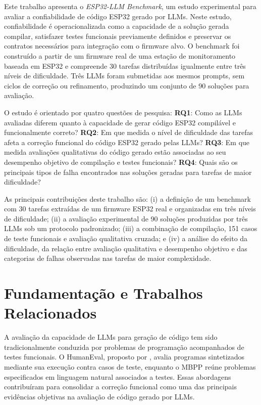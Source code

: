 \documentclass[12pt]{article}
\begin{document}
Este trabalho apresenta o \textit{ESP32-LLM Benchmark}, um estudo experimental para avaliar a confiabilidade de código ESP32 gerado por LLMs. Neste estudo, confiabilidade é operacionalizada como a capacidade de a solução gerada compilar, satisfazer testes funcionais previamente definidos e preservar os contratos necessários para integração com o firmware alvo. O benchmark foi construído a partir de um firmware real de uma estação de monitoramento baseada em ESP32 e compreende 30 tarefas distribuídas igualmente entre três níveis de dificuldade. Três LLMs foram submetidas aos mesmos prompts, sem ciclos de correção ou refinamento, produzindo um conjunto de 90 soluções para avaliação.

O estudo é orientado por quatro questões de pesquisa: \textbf{RQ1}: Como as LLMs avaliadas diferem quanto à capacidade de gerar código ESP32 compilável e funcionalmente correto? \textbf{RQ2}: Em que medida o nível de dificuldade das tarefas afeta a correção funcional do código ESP32 gerado pelas LLMs? \textbf{RQ3}: Em que medida avaliações qualitativas do código gerado estão associadas ao seu desempenho objetivo de compilação e testes funcionais? \textbf{RQ4}: Quais são os principais tipos de falha encontrados nas soluções geradas para tarefas de maior dificuldade?

As principais contribuições deste trabalho são: (i) a definição de um benchmark com 30 tarefas extraídas de um firmware ESP32 real e organizadas em três níveis de dificuldade; (ii) a avaliação experimental de 90 soluções produzidas por três LLMs sob um protocolo padronizado; (iii) a combinação de compilação, 151 casos de teste funcionais e avaliação qualitativa cruzada; e (iv) a análise do efeito da dificuldade, da relação entre avaliação qualitativa e desempenho objetivo e das categorias de falhas observadas nas tarefas de maior complexidade.

\section{Fundamentação e Trabalhos Relacionados}
\label{sec:relacionados}

A avaliação da capacidade de LLMs para geração de código tem sido tradicionalmente conduzida por problemas de programação acompanhados de testes funcionais. O HumanEval, proposto por \cite{chen2021codex}, avalia programas sintetizados mediante sua execução contra casos de teste, enquanto o MBPP \cite{austin2021program} reúne problemas especificados em linguagem natural associados a testes. Essas abordagens contribuíram para consolidar a correção funcional como uma das principais evidências objetivas na avaliação de código gerado por LLMs.
\end{document}
